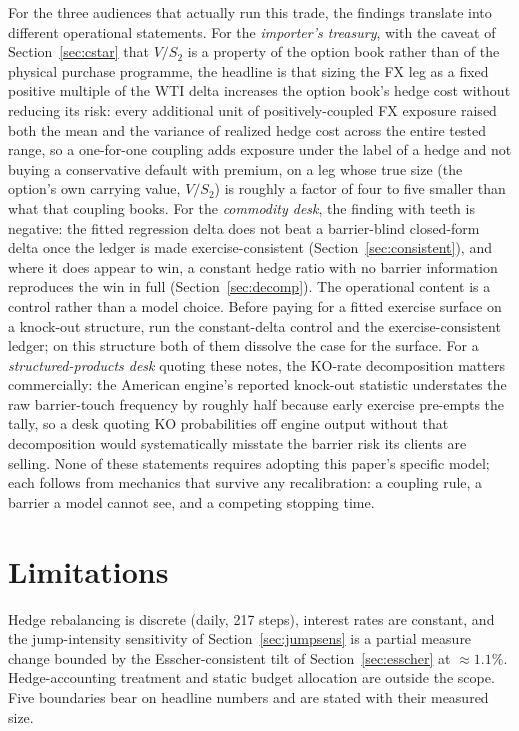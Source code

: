 \documentclass[11pt,a4paper]{article}
\begin{document}
For the three audiences that actually run this trade, the findings translate into different operational statements. For the \emph{importer's treasury}, with the caveat of Section~\ref{sec:cstar} that $V/S_2$ is a property of the option book rather than of the physical purchase programme, the headline is that sizing the FX leg as a fixed positive multiple of the WTI delta increases the option book's hedge cost without reducing its risk: every additional unit of positively-coupled FX exposure raised both the mean and the variance of realized hedge cost across the entire tested range, so a one-for-one coupling adds exposure under the label of a hedge and not buying a conservative default with premium, on a leg whose true size (the option's own carrying value, $V/S_2$) is roughly a factor of four to five smaller than what that coupling books. For the \emph{commodity desk}, the finding with teeth is negative: the fitted regression delta does not beat a barrier-blind closed-form delta once the ledger is made exercise-consistent (Section~\ref{sec:consistent}), and where it does appear to win, a constant hedge ratio with no barrier information reproduces the win in full (Section~\ref{sec:decomp}). The operational content is a control rather than a model choice. Before paying for a fitted exercise surface on a knock-out structure, run the constant-delta control and the exercise-consistent ledger; on this structure both of them dissolve the case for the surface. For a \emph{structured-products desk} quoting these notes, the KO-rate decomposition matters commercially: the American engine's reported knock-out statistic understates the raw barrier-touch frequency by roughly half because early exercise pre-empts the tally, so a desk quoting KO probabilities off engine output without that decomposition would systematically misstate the barrier risk its clients are selling. None of these statements requires adopting this paper's specific model; each follows from mechanics that survive any recalibration: a coupling rule, a barrier a model cannot see, and a competing stopping time.

\section{Limitations}
\label{sec:limitations}

Hedge rebalancing is discrete (daily, 217 steps), interest rates are constant, and the jump-intensity sensitivity of Section~\ref{sec:jumpsens} is a partial measure change bounded by the Esscher-consistent tilt of Section~\ref{sec:esscher} at $\approx1.1\%$. Hedge-accounting treatment and static budget allocation are outside the scope. Five boundaries bear on headline numbers and are stated with their measured size.
\end{document}
